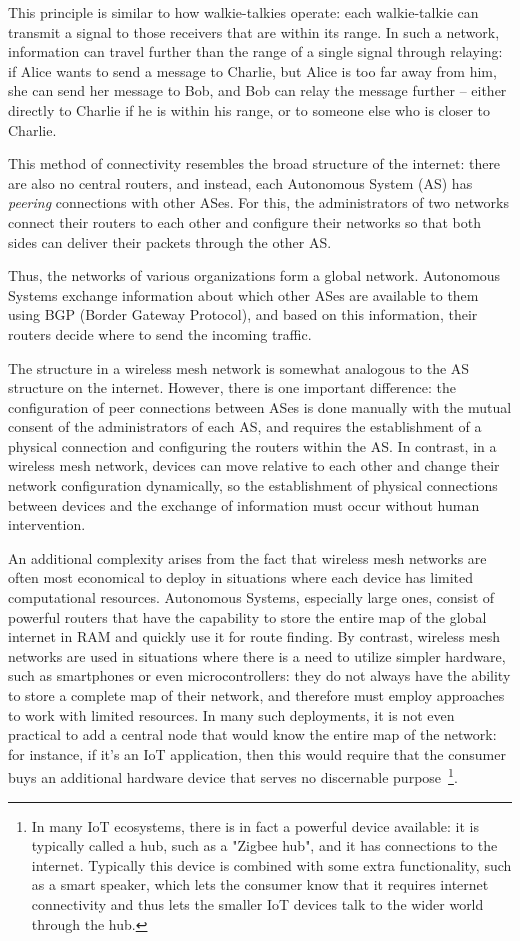 \documentclass[%
]{article}
\begin{document}
This principle is similar to how walkie-talkies operate:
each walkie-talkie can transmit a signal to those receivers that are within its range.
In such a network, information can travel further than the range of a single signal through relaying:
if Alice wants to send a message to Charlie, but Alice is too far away from him,
she can send her message to Bob, and Bob can relay the message further --
either directly to Charlie if he is within his range, or to someone else who is closer to Charlie.

This method of connectivity resembles the broad structure of the internet:
there are also no central routers, and instead, each Autonomous System (AS) has \emph{peering} connections with other ASes.
For this, the administrators of two networks connect their routers to each other and configure their networks
so that both sides can deliver their packets through the other AS.

Thus, the networks of various organizations form a global network.
Autonomous Systems exchange information about which other ASes
are available to them using BGP (Border Gateway Protocol),
and based on this information, their routers decide where to send the incoming traffic.

The structure in a wireless mesh network is somewhat analogous to the AS structure on the internet.
However, there is one important difference: the configuration of peer connections between ASes is done manually
with the mutual consent of the administrators of each AS, and requires the establishment of a physical connection
and configuring the routers within the AS.
In contrast, in a wireless mesh network, devices can move relative to each other
and change their network configuration dynamically, so the establishment of physical connections
between devices and the exchange of information must occur without human intervention.

An additional complexity arises from the fact that wireless mesh networks are often most economical to deploy in situations
where each device has limited computational resources. Autonomous Systems,
especially large ones, consist of powerful routers that have the capability to store the entire map of the global
internet in RAM and quickly use it for route finding.
By contrast, wireless mesh networks are used in situations
where there is a need to utilize simpler hardware, such as smartphones or even microcontrollers:
they do not always have the ability to store a complete map of their network, and therefore must employ approaches to work with limited resources.
In many such deployments, it is not even practical to add a central node that would know the entire map of the network:
for instance, if it's an IoT application, then this would require that the consumer buys an additional hardware device
that serves no discernable purpose~\footnote{In many IoT ecosystems, there is in fact a powerful device available:
it is typically called a hub, such as a "Zigbee hub", and it has connections to the internet.
Typically this device is combined with some extra functionality, such as a smart speaker,
which lets the consumer know that it requires internet connectivity
and thus lets the smaller IoT devices talk to the wider world through the hub.}.
\end{document}
